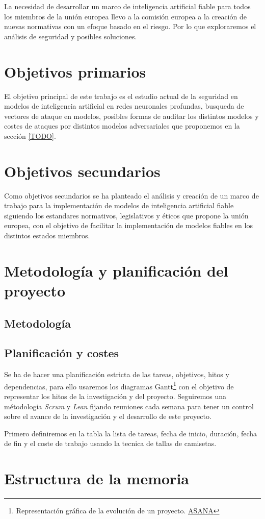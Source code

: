 La necesidad de desarrollar un marco de inteligencia artificial fiable para todos los miembros de la unión europea llevo a la comisión europea a la creación de nuevas normativas con un efoque basado en el riesgo.
Por lo que exploraremos el análisis de seguridad y posibles soluciones.


\section{Objetivos primarios}
El objetivo principal de este trabajo es el estudio actual de la seguridad en modelos de inteligencia artificial en redes neuronales profundas, busqueda de vectores de ataque en modelos, posibles formas de auditar los distintos modelos y costes de ataques por distintos modelos adversariales que proponemos en la sección \ref{TODO}.


\section{Objetivos secundarios}
Como objetivos secundarios se ha planteado el análisis y creación de un marco de trabajo para la implementación de modelos de inteligencia artificial fiable siguiendo los estandares normativos, legislativos y éticos que propone la unión europea, con el objetivo de facilitar la implementación de modelos fiables en los distintos estados miembros.

\section{Metodología y planificación del proyecto}


\subsection{Metodología}


\subsection{Planificación y costes}

Se ha de hacer una planificación estricta de las tareas, objetivos, hitos y dependencias, para ello usaremos los diagramas Gantt\footnote{Representación gráfica de la evolución de un proyecto. \href{https://asana.com/es/resources/gantt-chart-basics}{ASANA}} con el objetivo de representar los hitos de la investigación y del proyecto.
Seguiremos una métodologia \textit{Scrum} y \textit{Lean} fijando reuniones cada semana para tener un control sobre el avance de la investigación y el desarrollo de este proyecto.

Primero definiremos en la tabla la lista de tareas, fecha de inicio, duración, fecha de fin y el coste de trabajo usando la tecnica de tallas de camisetas.


\section{Estructura de la memoria}

